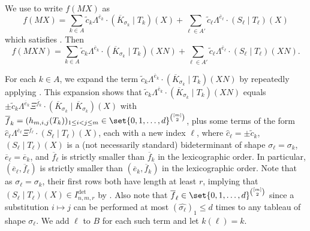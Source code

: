 \documentclass[10pt,a4paper]{amsart}
\begin{document}
\begin{pf}
We use  to write $f(MX)$ as 
\[
    f(MX) = \sum_{k \in A} \widetilde{c}_k \Lambda^{\overline{e}_k}\cdot (\overline{K}_{\sigma_k}\mid T_k)(X) + \sum_{\ell\in A'} \widetilde{c}_{\ell} \Lambda^{\overline{e}_\ell}\cdot (S_\ell\mid T_\ell)(X)
\]
which satisfies .
Then
\[
f(MXN)=\sum_{k \in A} \widetilde{c}_{k} \Lambda^{\overline{e}_k}\cdot (\overline{K}_{\sigma_k}\mid T_k)(XN)
+\sum_{\ell \in A'} \widetilde{c}_{\ell} \Lambda^{\overline{e}_\ell}\cdot (S_\ell\mid T_\ell)(XN).
\]

For each $k\in A$, we expand the term $\widetilde{c}_{k} \Lambda^{\overline{e}_k}\cdot (\overline{K}_{\sigma_k}\mid T_k)(XN)$ by repeatedly applying .
This expansion shows that $\widetilde{c}_{k} \Lambda^{\overline{e}_k}\cdot (\overline{K}_{\sigma_k}\mid T_k)(XN)$ equals $\pm \widetilde{c}_{k} \Lambda^{\overline{e}_k}\Xi^{\overline{f}_k}\cdot (\overline{K}_{\sigma_k}\mid \overline{K}_{\sigma_k})(X)$ with $\overline{f}_k=(h_{m,i,j}(T_k))_{1\leq i<j\leq m} \in \set{0,1,\dots,d}^{\binom{[m]}{2}}$, 
plus some terms of the form $\widehat{c}_{\ell}\Lambda^{\overline{e}_\ell}\Xi^{\overline{f}_\ell}\cdot (S_\ell\mid T_\ell)(X)$, each with a new index $\ell$,
where $\widehat{c}_{\ell}=\pm \widetilde{c}_k$, $(S_\ell\mid T_\ell)(X)$ is a (not necessarily standard) bideterminant of shape $\sigma_\ell=\sigma_k$, $\overline{e}_\ell=\overline{e}_k$, and $\overline{f}_\ell$ is strictly smaller than $\overline{f}_k$ in the lexicographic order.
In particular, $(\overline{e}_\ell, \overline{f}_\ell)$ is strictly smaller than $(\overline{e}_k, \overline{f}_k)$ in the lexicographic order.
Note that as $\sigma_\ell=\sigma_k$, their first rows both have length at least $r$, implying that $(S_\ell\mid T_\ell)(X)\in I^{\det}_{n,m,r}$ by .
Also note that $\overline{f}_\ell \in \set{0,1,\dots,d}^{\binom{[m]}{2}}$ since a substitution $i\mapsto j$ can be performed at most $(\widehat{\sigma_\ell})_1 \leq d$ times to any tableau of shape $\sigma_\ell$.
We add $\ell$ to $B$ for each such term and let $k(\ell)=k$.


\end{pf}
\end{document}
